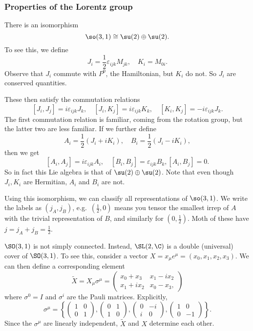 \documentclass[a4paper]{article}
\begin{document}
\subsubsection*{Properties of the Lorentz group}
There is an isomorphism
\[
  \so(3, 1) \cong \su(2) \oplus \su(2).
\]
To see this, we define
\[
  J_i = \frac{1}{2} \varepsilon_{ijk} M_{jk},\quad K_i = M_{0i}.
\]
Observe that $J_i$ commute with $P^0$, the Hamiltonian, but $K_i$ do not. So $J_i$ are conserved quantities.

These then satisfy the commutation relations
\[
  [J_i, J_j] = i\varepsilon_{ijk} J_k,\quad [J_i, K_j] = i \varepsilon_{ijk} K_k,\quad [K_i, K_j] = -i \varepsilon_{ijk} J_k.
\]
The first commutation relation is familiar, coming from the rotation group, but the latter two are less familiar. If we further define
\[
  A_i = \frac{1}{2} (J_i + i K_i),\quad B_i = \frac{1}{2} (J_i - i K_i),
\]
then we get
\[
  [A_i, A_j] = i \varepsilon_{ijk} A_i,\quad [B_i, B_j] = \varepsilon_{ijk} B_k, [A_i, B_j] = 0.
\]
So in fact this Lie algebra is that of $\su(2) \oplus \su(2)$. Note that even though $J_i, K_i$ are Hermitian, $A_i$ and $B_i$ are not.

Using this isomorphism, we can classify all representations of $\so(3, 1)$. We write the labels as $(j_A, j_B)$, e.g.\ $(\frac{1}{2}, 0)$ means you tensor the smallest irrep of $A$ with the trivial representation of $B$, and similarly for $(0, \frac{1}{2})$. Moth of these have $j = j_A + j_B = \frac{1}{2}$.

$\SO(3, 1)$ is not simply connected. Instead, $\SL(2, \C)$ is a double (universal) cover of $\SO(3, 1)$. To see this, consider a vector $X = x_\mu e^\mu = (x_0, x_1, x_2, x_3)$. We can then define a corresponding element
\[
  \tilde{X} = X_\mu \sigma^\mu =
  \begin{pmatrix}
    x_0 + x_3 & x_1 - i x_2\\
    x_1 + i x_2 & x_0 - x_3,
  \end{pmatrix}
\]
where $\sigma^0 = I$ and $\sigma^i$ are the Pauli matrices. Explicitly,
\[
  \sigma^\mu = \left\{
    \begin{pmatrix}
      1 & 0\\
      0 & 1
    \end{pmatrix},
    \begin{pmatrix}
      0 & 1\\
      1 & 0
    \end{pmatrix},
    \begin{pmatrix}
      0 & -i\\
      i & 0
    \end{pmatrix},
    \begin{pmatrix}
      1 & 0\\
      0 & -1
    \end{pmatrix}
  \right\}.
\]
Since the $\sigma^\mu$ are linearly independent, $\tilde{X}$ and $X$ determine each other.
\end{document}
